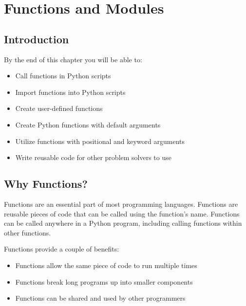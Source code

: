 \documentclass{book}
\begin{document}
    
        \hypertarget{functions-and-modules}{%
\chapter{Functions and Modules}\label{functions-and-modules}}
    




    
        \hypertarget{introduction}{%
\section{Introduction}\label{introduction}}
    




    
        By the end of this chapter you will be able to:

\begin{itemize}
\item
  Call functions in Python scripts
\item
  Import functions into Python scripts
\item
  Create user-defined functions
\item
  Create Python functions with default arguments
\item
  Utilize functions with positional and keyword arguments
\item
  Write reusable code for other problem solvers to use
\end{itemize}
        \newpage

    




    
        \hypertarget{why-functions}{%
\section{Why Functions?}\label{why-functions}}
    




    
        Functions are an essential part of most programming languages. Functions
are reusable pieces of code that can be called using the function's
name. Functions can be called anywhere in a Python program, including
calling functions within other functions.

Functions provide a couple of benefits:

\begin{itemize}
\item
  Functions allow the same piece of code to run multiple times
\item
  Functions break long programs up into smaller components
\item
  Functions can be shared and used by other programmers
\end{itemize}
\end{document}
